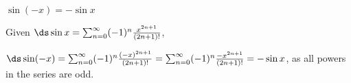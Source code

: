 {$\sin(-x) = -\sin x$
}
{Given $\ds \sin x = \sum_{n=0}^\infty (-1)^n\frac{x^{2n+1}}{(2n+1)!}$,

$\ds\sin (-x) = \sum_{n=0}^\infty (-1)^n\frac{(-x)^{2n+1}}{(2n+1)!}=\sum_{n=0}^\infty (-1)^n\frac{-x^{2n+1}}{(2n+1)!}=-\sin x$, as all powers in the series are odd.
}